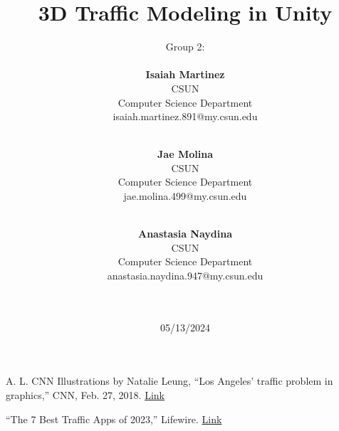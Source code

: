 \documentclass[a4paper,10pt]{article}
\begin{document}
%
    \title{3D Traffic Modeling in Unity}

    \author{

    Group 2:\\\\
    
    \textbf{Isaiah Martinez} \\ CSUN \\ Computer Science Department \\ isaiah.martinez.891@my.csun.edu
    \\
    \and
    \\
    \textbf{Jae Molina} \\ CSUN \\ Computer Science Department \\ jae.molina.499@my.csun.edu
    \\
    \and
    \\
    \textbf{Anastasia Naydina} \\ CSUN \\ Computer Science Department \\ anastasia.naydina.947@my.csun.edu
    \\\\\\
    }
          
    \date{05/13/2024}

    \maketitle
    
    \newpage
   
    \tableofcontents
 
    \newpage
    
    

    

    

    

    

    

    \newpage

    \begin{thebibliography}{}
    
    

     A. L. CNN Illustrations by Natalie Leung, ``Los Angeles' traffic problem in graphics,'' CNN, Feb. 27, 2018. \href{https://www.cnn.com/2018/02/27/americas/los-angeles-traffic/index.html}{Link}

     “The 7 Best Traffic Apps of 2023,” Lifewire. \href{https://www.lifewire.com/best-traffic-apps-4570916}{Link}

    \end{thebibliography}
\end{document}
